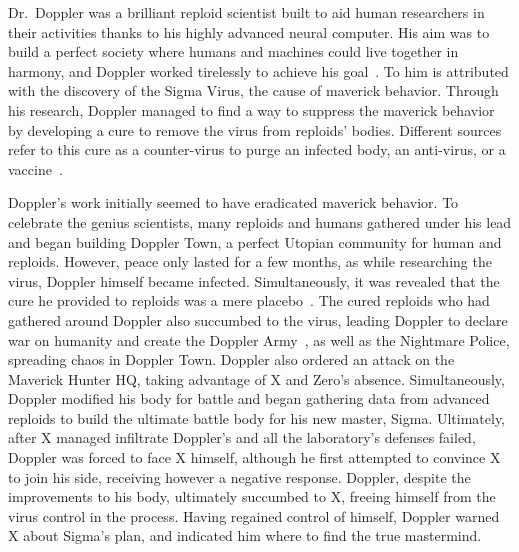 Dr.~Doppler was a brilliant reploid scientist built to aid human researchers in their activities thanks to his highly advanced neural computer. His aim was to build a perfect society where humans and machines could live together in harmony, and Doppler worked tirelessly to achieve his goal~\cite{wayback:X3_resources}. To him is attributed with the discovery of the Sigma Virus, the cause of maverick behavior. Through his research, Doppler managed to find a way to suppress the maverick behavior by developing a cure to remove the virus from reploids' bodies. Different sources refer to this cure as a counter-virus to purge an infected body, an anti-virus, or a vaccine~\cite{Xcoll1:Manual_X3,X3:Manual,book:MH_field_guide}.

Doppler's work initially seemed to have eradicated maverick behavior. To celebrate the genius scientists, many reploids and humans gathered under his lead and began building Doppler Town, a perfect Utopian community for human and reploids. However, peace only lasted for a few months, as while researching the virus, Doppler himself became infected. Simultaneously, it was revealed that the cure he provided to reploids was a mere placebo~\cite{book:MH_field_guide}. The cured reploids who had gathered around Doppler also succumbed to the virus, leading Doppler to declare war on humanity and create the Doppler Army~\cite{wiki:Doppler}, as well as the Nightmare Police, spreading chaos in Doppler Town. Doppler also ordered an attack on the Maverick Hunter HQ, taking advantage of X and Zero's absence. Simultaneously, Doppler modified his body for battle and began gathering data from advanced reploids to build the ultimate battle body for his new master, Sigma. Ultimately, after X managed infiltrate Doppler's and all the laboratory's defenses failed, Doppler was forced to face X himself, although he first attempted to convince X to join his side, receiving however a negative response. Doppler, despite the improvements to his body, ultimately succumbed to X, freeing himself from the virus control in the process. Having regained control of himself, Doppler warned X about Sigma's plan, and indicated him where to find the true mastermind.

